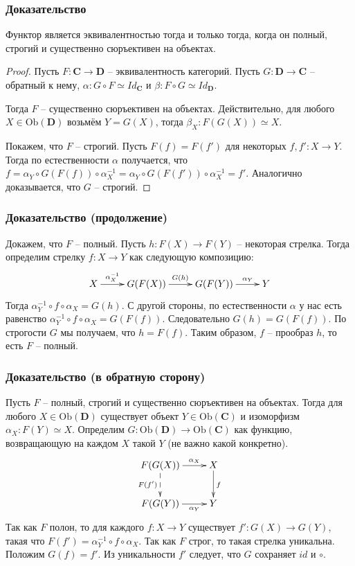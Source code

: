 \documentclass{beamer}
\theoremstyle{definition}
\newcommand{\cat}[1]{\mathbf{#1}}
\renewcommand{\C}{\cat{C}}
\newcommand{\D}{\cat{D}}
\newcommand{\fs}[1]{\mathrm{#1}}
\newcommand{\Ob}{\fs{Ob}}
\begin{document}
\begin{frame}
\frametitle{Доказательство}
\begin{prop}
Функтор является эквивалентностью тогда и только тогда, когда он полный, строгий и существенно сюръективен на объектах.
\end{prop}
\begin{proof}
Пусть $F : \C \to \D$ -- эквивалентность категорий.
Пусть $G : \D \to \C$ -- обратный к нему, $\alpha : G \circ F \simeq Id_\C$ и $\beta : F \circ G \simeq Id_\D$.

Тогда $F$ -- существенно сюръективен на объектах.
Действительно, для любого $X \in \Ob(\D)$ возьмём $Y = G(X)$, тогда $\beta_X : F(G(X)) \simeq X$.

Покажем, что $F$ -- строгий.
Пусть $F(f) = F(f')$ для некоторых $f,f' : X \to Y$.
Тогда по естественности $\alpha$ получается, что $f = \alpha_Y \circ G(F(f)) \circ \alpha^{-1}_X = \alpha_Y \circ G(F(f')) \circ \alpha^{-1}_X = f'$.
Аналогично доказывается, что $G$ -- строгий.
\end{proof}
\end{frame}

\begin{frame}
\frametitle{Доказательство (продолжение)}
Докажем, что $F$ -- полный.
Пусть $h : F(X) \to F(Y)$ -- некоторая стрелка.
Тогда определим стрелку $f : X \to Y$ как следующую композицию:
\[ \xymatrix{ X \ar[r]^-{\alpha^{-1}_X} & G(F(X)) \ar[r]^{G(h)} & G(F(Y)) \ar[r]^-{\alpha_Y} & Y } \]
Тогда $\alpha^{-1}_Y \circ f \circ \alpha_X = G(h)$.
С другой стороны, по естественности $\alpha$ у нас есть равенство $\alpha^{-1}_Y \circ f \circ \alpha_X = G(F(f))$.
Следовательно $G(h) = G(F(f))$.
По строгости $G$ мы получаем, что $h = F(f)$.
Таким образом, $f$ -- прообраз $h$, то есть $F$ -- полный.
\end{frame}

\begin{frame}
\frametitle{Доказательство (в обратную сторону)}
Пусть $F$ -- полный, строгий и существенно сюръективен на объектах.
Тогда для любого $X \in \Ob(\D)$ существует объект $Y \in \Ob(\C)$ и изоморфизм $\alpha_X : F(Y) \simeq X$.
Определим $G : \Ob(\D) \to \Ob(\C)$ как функцию, возвращающую на каждом $X$ такой $Y$ (не важно какой конкретно).
\[ \xymatrix{ F(G(X)) \ar[r]^-{\alpha_X} \ar@{-->}[d]_{F(f')} & X \ar[d]^f \\
              F(G(Y)) \ar[r]_-{\alpha_Y}                      & Y
            } \]
Так как $F$ полон, то для каждого $f : X \to Y$ существует $f' : G(X) \to G(Y)$, такая что $F(f') = \alpha^{-1}_Y \circ f \circ \alpha_X$.
Так как $F$ строг, то такая стрелка уникальна.
Положим $G(f) = f'$.
Из уникальности $f'$ следует, что $G$ сохраняет $id$ и $\circ$.
\end{frame}
\end{document}

